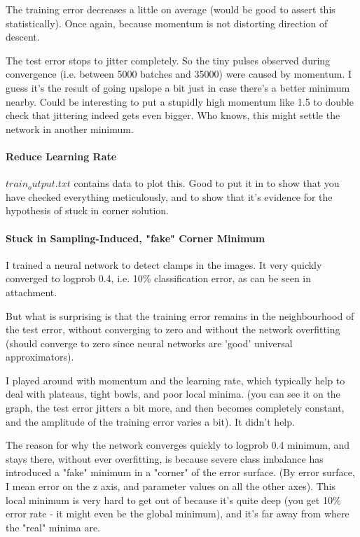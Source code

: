 \documentclass[a4paper,11pt]{article}
\begin{document}
The training error decreases a little on average (would be good to assert this statistically). Once again, because momentum is not 	distorting direction of descent.

The test error stops to jitter completely. So the tiny pulses observed during convergence (i.e. between 5000 batches and 35000) were caused by momentum. I guess it's the result of going upslope a bit just in case there's a better minimum nearby. Could be interesting to put a stupidly high momentum like 1.5 to double check that jittering indeed gets even bigger. Who knows, this might settle the network in another minimum. 


\paragraph{Reduce Learning Rate}

$train_output.txt$ contains data to plot this. Good to put it in to show that you have checked everything meticulously, and to show that it's evidence for the hypothesis of stuck in corner solution.


\paragraph{Stuck in Sampling-Induced, "fake" Corner Minimum}

I trained a neural network to detect clamps in the images. It very quickly converged to logprob 0.4, i.e. 10\% classification error, as can be seen in attachment.

But what is surprising is that the training error remains in the neighbourhood of the test error, without converging to zero and without the network overfitting (should converge to zero since neural networks are 'good' universal approximators).

I played around with momentum and the learning rate, which typically help to deal with plateaus, tight bowls, and poor local minima. (you can see it on the graph, the test error jitters a bit more, and then becomes completely constant, and the amplitude of the training error varies a bit). It didn't help.

The reason for why the network converges quickly to logprob 0.4 minimum, and stays there, without ever overfitting, is because severe class imbalance has introduced a "fake" minimum in a "corner" of the error surface. (By error surface, I mean error on the z axis, and parameter values on all the other axes). This local minimum is very hard to get out of because it's quite deep (you get 10\% error rate - it might even be the global minimum), and it's far away from where the "real" minima are. \\
\end{document}
